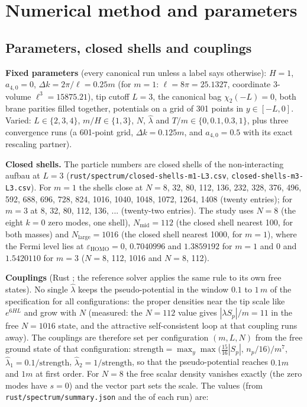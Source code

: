 \documentclass[11pt]{article}
\begin{document}
\section{Numerical method and parameters}

\subsection{Parameters, closed shells and couplings}

\textbf{Fixed parameters} (every canonical run unless a label says otherwise): $H=1$, $a_{4,0}=0$, $\Delta k=2\pi/\ell=0.25m$ (for $m=1$: $\ell=8\pi=25.1327$, coordinate 3-volume $\ell^3=15875.21$), tip cutoff $L=3$, the canonical bag $\chi_2(-L)=0$, both brane parities filled together, potentials on a grid of 301 points in $y\in[-L,0]$. Varied: $L\in\{2,3,4\}$, $m/H\in\{1,3\}$, $N$, $\hat\lambda$ and $T/m\in\{0,0.1,0.3,1\}$, plus three convergence runs (a 601-point grid, $\Delta k=0.125m$, and $a_{4,0}=0.5$ with its exact rescaling partner).

\textbf{Closed shells.} The particle numbers are closed shells of the non-interacting aufbau at $L=3$ (\texttt{rust/spe\allowbreak{}ctrum/cl\allowbreak{}osed-she\allowbreak{}lls-m1-L\allowbreak{}3.csv}, \texttt{closed-s\allowbreak{}hells-m3\allowbreak{}-L3.csv}). For $m=1$ the shells close at $N=8$, 32, 80, 112, 136, 232, 328, 376, 496, 592, 688, 696, 728, 824, 1016, 1040, 1048, 1072, 1264, 1408 (twenty entries); for $m=3$ at 8, 32, 80, 112, 136, ... (twenty-two entries). The study uses $N=8$ (the eight $k=0$ zero modes, one shell), $N_{\mathrm{mid}}=112$ (the closed shell nearest 100, for both masses) and $N_{\mathrm{large}}=1016$ (the closed shell nearest 1000, for $m=1$), where the Fermi level lies at $\varepsilon_{\mathrm{HOMO}}=0$, $0.7040996$ and $1.3859192$ for $m=1$ and $0$ and $1.5420110$ for $m=3$ ($N=8$, 112, 1016 and $N=8$, 112).

\textbf{Couplings} (Rust \texttt{}; the reference solver applies the same rule to its own free states). No single $\hat\lambda$ keeps the pseudo-potential in the window $0.1$ to $1\,m$ of the specification for all configurations: the proper densities near the tip scale like $e^{6HL}$ and grow with $N$ (measured: the $N=112$ value gives $|\lambda S_p|/m=11$ in the free $N=1016$ state, and the attractive self-consistent loop at that coupling runs away). The couplings are therefore set per configuration $(m,L,N)$ from the free ground state of that configuration: $\mathrm{strength}=\max_y\max\bigl(\tfrac{15}{16}|S_p|,\,n_p/16\bigr)/m^7$, $\hat\lambda_1=0.1/\mathrm{strength}$, $\hat\lambda_2=1/\mathrm{strength}$, so that the pseudo-potential reaches $0.1m$ and $1m$ at first order. For $N=8$ the free scalar density vanishes exactly (the zero modes have $s=0$) and the vector part sets the scale. The values (from \texttt{rust/spe\allowbreak{}ctrum/su\allowbreak{}mmary.js\allowbreak{}on} and the \texttt{} of each run) are:
\end{document}
